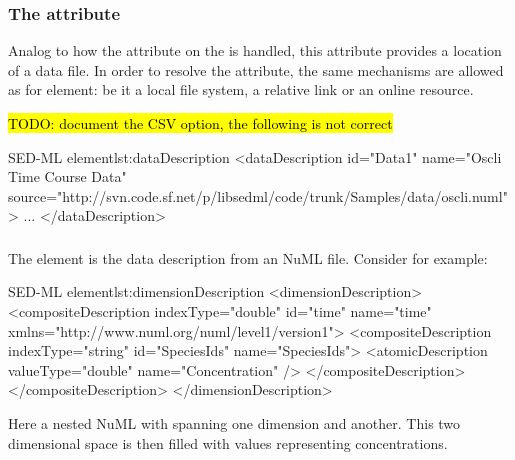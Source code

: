 \subsubsection{The  attribute}
\label{sec:sedsource}
Analog to how the  attribute on the \SedModel is handled, this attribute provides a location of a data file. In order to resolve the  attribute, the same mechanisms are allowed as for \SedModel element: be it a local file system, a relative link or an online resource.

\hl{TODO: document the CSV option, the following is not correct}

\begin{myXmlLst}{SED-ML  element}{lst:dataDescription}
   <dataDescription id="Data1" name="Oscli Time Course Data" 
     source="http://svn.code.sf.net/p/libsedml/code/trunk/Samples/data/oscli.numl" >
     ...
    </dataDescription>
\end{myXmlLst} 


\subsubsection{}
\label{class:dimensionDescription}

The  element is the data description from an NuML file. Consider for example:

\begin{myXmlLst}{SED-ML  element}{lst:dimensionDescription}
    <dimensionDescription>
        <compositeDescription indexType="double" id="time" name="time" 
          xmlns="http://www.numl.org/numl/level1/version1">
        <compositeDescription indexType="string" id="SpeciesIds" name="SpeciesIds">
            <atomicDescription valueType="double" name="Concentration" />
        </compositeDescription>
        </compositeDescription>
    </dimensionDescription>
\end{myXmlLst} 

Here a nested NuML  with  spanning one dimension and  another. This two dimensional space is then filled with  values representing concentrations.


